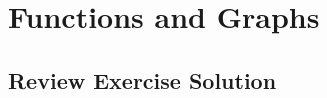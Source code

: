\documentclass[11pt, letterpaper, oneside]{memoir}
\begin{document}
\chapter{Functions and Graphs}

\section*{Review Exercise Solution}


\end{document}
